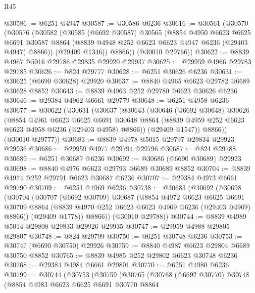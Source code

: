 \begin{lexlean}{R45}
\begin{coremodule}
{@30586 := @6251 @4947
@30587 := @30586 @6236
@30616 := @30561
    (@30570
      (@30576
        (@30582
          (@30585
            (@6692 @30587)
            @30565
            (@8854
              @4950
              @6623
              @6625
              @6691
              @30587
              @8864
              (@8839 @4948 @252 @6623 @6623 @4947 @6236 (@29403 @4947) @8866))
            (@29409 @1346))
          @8866))
      (@30010 @29766))
@30622 := @8839 @4967 @5016 @29786 @29835 @29920 @29937
@30625 := @29959 @4966 @29783 @29785
@30626 := @824 @29777
@30628 := @6251 @30626 @6236
@30631 := @30625 (@6690 @30628) @29920
@30637 := @8840 @4965 @6623 @29782 @6689 @30628 @8852
@30643 := @8839 @4963 @252 @29780 @6623 @30626 @6236
@30646 := @29384 @4962 @6661 @29779
@30648 := @6251 @4958 @6236
@30677 := @30622
    (@30631
      (@30637
        (@30643
          (@30646
            (@6692 @30648)
            @30626
            (@8854
              @4961
              @6623
              @6625
              @6691
              @30648
              @8864
              (@8839 @4959 @252 @6623 @6623 @4958 @6236 (@29403 @4958) @8866))
            (@29409 @1547))
          @8866))
      (@30010 @29777))
@30683 := @8839 @4978 @5015 @29797 @29834 @29923 @29936
@30686 := @29959 @4977 @29794 @29796
@30687 := @824 @29788
@30689 := @6251 @30687 @6236
@30692 := @30686 (@6690 @30689) @29923
@30698 := @8840 @4976 @6623 @29793 @6689 @30689 @8852
@30704 := @8839 @4974 @252 @29791 @6623 @30687 @6236
@30707 := @29384 @4973 @6661 @29790
@30709 := @6251 @4969 @6236
@30738 := @30683
    (@30692
      (@30698
        (@30704
          (@30707
            (@6692 @30709)
            @30687
            (@8854
              @4972
              @6623
              @6625
              @6691
              @30709
              @8864
              (@8839 @4970 @252 @6623 @6623 @4969 @6236 (@29403 @4969) @8866))
            (@29409 @1778))
          @8866))
      (@30010 @29788))
@30744 := @8839 @4989 @5014 @29808 @29833 @29926 @29935
@30747 := @29959 @4988 @29805 @29807
@30748 := @824 @29799
@30750 := @6251 @30748 @6236
@30753 := @30747 (@6690 @30750) @29926
@30759 := @8840 @4987 @6623 @29804 @6689 @30750 @8852
@30765 := @8839 @4985 @252 @29802 @6623 @30748 @6236
@30768 := @29384 @4984 @6661 @29801
@30770 := @6251 @4980 @6236
@30799 := @30744
    (@30753
      (@30759
        (@30765
          (@30768
            (@6692 @30770)
            @30748
            (@8854
              @4983
              @6623
              @6625
              @6691
              @30770
              @8864
}
\end{coremodule}
\end{lexlean}
